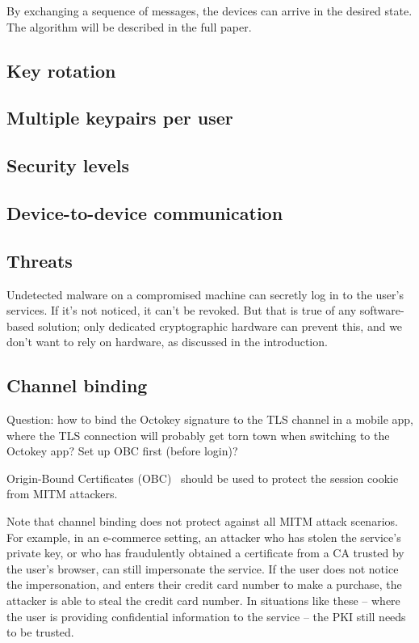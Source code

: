 By exchanging a sequence of messages, the devices can arrive in the desired state. The algorithm
will be described in the full paper.

\subsection{Key rotation}
\subsection{Multiple keypairs per user}
\subsection{Security levels}
\subsection{Device-to-device communication}
\subsection{Threats}
Undetected malware on a compromised machine can secretly log in to the user's services. If it's not
noticed, it can't be revoked. But that is true of any software-based solution; only dedicated
cryptographic hardware can prevent this, and we don't want to rely on hardware, as discussed in the
introduction.

\subsection{Channel binding}

Question: how to bind the Octokey signature to the TLS channel in a mobile app, where the TLS
connection will probably get torn town when switching to the Octokey app? Set up OBC first (before
login)?

Origin-Bound Certificates (OBC)~\cite{Dietz12} should be used to protect the session cookie from
MITM attackers.

Note that channel binding does not protect against all MITM attack scenarios. For example, in an
e-commerce setting, an attacker who has stolen the service's private key, or who has fraudulently
obtained a certificate from a CA trusted by the user's browser, can still impersonate the service.
If the user does not notice the impersonation, and enters their credit card number to make a
purchase, the attacker is able to steal the credit card number. In situations like these -- where
the user is providing confidential information to the service -- the PKI still needs to be trusted.

